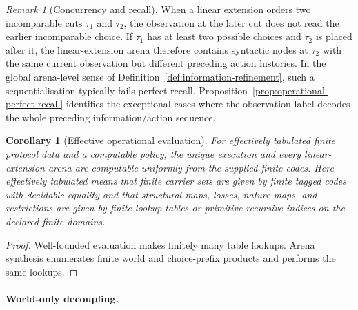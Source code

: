 \documentclass[11pt]{article}
\theoremstyle{plain}
\newtheorem{corollary}[theorem]{Corollary}
\theoremstyle{definition}
\theoremstyle{remark}
\newtheorem{remark}[theorem]{Remark}
\begin{document}
\begin{remark}[Concurrency and recall]
When a linear extension orders two incomparable cuts $\tau_1$ and $\tau_2$, the
observation at the later cut does not read the earlier incomparable choice. If
$\tau_1$ has at least two possible choices and $\tau_2$ is placed after it, the
linear-extension arena therefore contains syntactic nodes at $\tau_2$ with the
same current observation but different preceding action histories. In the global
arena-level sense of Definition~\ref{def:information-refinement}, such a
sequentialisation typically fails perfect recall. Proposition~\ref{prop:operational-perfect-recall}
identifies the exceptional cases where the observation label decodes the whole
preceding information/action sequence.
\end{remark}

\begin{corollary}[Effective operational evaluation]
\label{cor:effective-operational}
For effectively tabulated finite protocol data and a computable policy, the
unique execution and every linear-extension arena are computable uniformly from
the supplied finite codes. Here effectively tabulated means that finite carrier
sets are given by finite tagged codes with decidable equality and that structural
maps, losses, nature maps, and restrictions are given by finite lookup tables or
primitive-recursive indices on the declared finite domains.
\end{corollary}

\begin{proof}
Well-founded evaluation makes finitely many table lookups. Arena synthesis
enumerates finite world and choice-prefix products and performs the same
lookups.
\end{proof}

\paragraph{World-only decoupling.}
\end{document}
